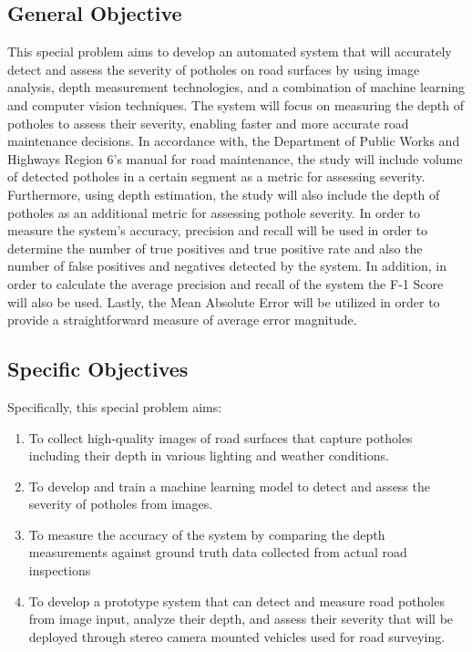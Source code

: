 \subsection{General Objective}
\label{sec:generalobjective}

This special problem aims to develop an automated system that will accurately detect and assess the severity of potholes on road surfaces by using image analysis, depth measurement technologies, and a combination of machine learning and computer vision techniques. The system will focus on measuring the depth of potholes to assess their severity, enabling faster and more accurate road maintenance decisions. In accordance with, the Department of Public Works and Highways Region 6's manual for road maintenance, the study will include volume of detected potholes in a certain segment as a metric for assessing severity. Furthermore, using depth estimation, the study will also include the depth of potholes as an additional metric for assessing pothole severity. In order to measure the system's accuracy, precision and recall will be used in order to determine the number of true positives and true positive rate and also the number of false positives and negatives detected by the system. In addition, in order to calculate the average precision and recall of the system the F-1 Score will also be used. Lastly, the Mean Absolute Error will be utilized in order to provide a straightforward measure of average error magnitude.



\subsection{Specific Objectives}
\label{sec:specificobjectives}

Specifically, this special problem aims:
\begin{enumerate}
	\item To collect high-quality images of road surfaces that capture potholes including their depth in various lighting and weather conditions.
	\item To develop and train a machine learning model to detect and assess the severity of potholes from images. 
	\item To measure the accuracy of the system by comparing the depth measurements against ground truth data collected from actual road inspections
	\item To develop a prototype system that can detect and measure road potholes from image input, analyze their depth, and assess their severity that will be deployed through stereo camera mounted vehicles used for road surveying.
\end{enumerate}


